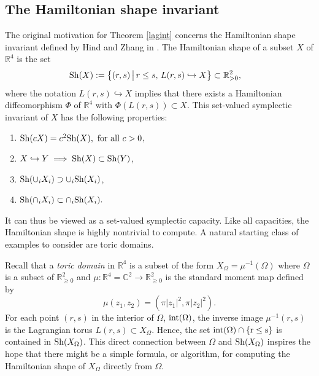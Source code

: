 \documentclass[12pt]{amsart}
\theoremstyle{definition}
\newcommand{\CC}{{\mathbb C}}
\newcommand{\RR}{{\mathbb R}}
\begin{document}
\subsection{The Hamiltonian shape invariant}
The original motivation for Theorem \ref{lagint} concerns the Hamiltonian shape invariant  defined  by Hind and Zhang in \cite{hizh}. The Hamiltonian shape of a subset $X$ of $\RR^4$ is the set 
\begin{align*} 
{\rm Sh}(X) & : = \left\{(r, s) \, \big| \, r \le s, \,  L(r, s) \hookrightarrow X \right\} \subset \RR_{>0}^2,
\end{align*}
where the notation $L(r, s) \hookrightarrow X$ implies that there exists a Hamiltonian diffeomorphism $\Phi$ of $\RR^4$ with $\Phi(L(r,s)) \subset X$. This set-valued symplectic invariant of $X$ has the following properties:\\
\begin{enumerate}
    \item ${\rm Sh}(cX) = c^2 {\rm Sh}(X), \text{ for all } c>0$,\\
    \item $X \hookrightarrow Y \implies {\rm Sh}(X)\subset {\rm Sh}(Y)$,\\
    \item ${\rm Sh}(\cup_i X_i) \supset \cup_i {\rm Sh}(X_i)$,\\
    \item ${\rm Sh}(\cap_i X_i) \subset \cap_i {\rm Sh}(X_i).$\\
\end{enumerate}
It can thus be viewed as a set-valued symplectic capacity. Like all capacities, the Hamiltonian shape is highly nontrivial to compute. A natural starting class of examples to consider are toric domains. 

Recall that a 
{\em toric domain} in $\RR^4$ is a subset of the form $X_{\Omega} = \mu^{-1} (\Omega)$ where $\Omega$ is a subset of $\RR^2_{\ge 0}$
and $\mu: \RR^4=\CC^2 \to \RR^2_{\ge 0}$ is the standard moment map defined by $$\mu(z_1, z_2) = (\pi|z_1|^2, \pi |z_2|^2).$$ 
For each point $(r,s)$ in the interior of $\Omega$, $\rm{int}(\Omega)$, the inverse image $\mu^{-1}(r,s)$ is the Lagrangian torus $L(r,s) \subset X_{\Omega}$. Hence, the set $\rm{int}(\Omega) \cap \{ r \leq s\}$ is contained in ${\rm Sh} (X_{\Omega})$. This direct connection between $\Omega$ and ${\rm Sh}(X_\Omega)$ inspires the hope that there might be a simple 
formula, or algorithm, for computing the Hamiltonian shape of $X_{\Omega}$ directly from $\Omega$.
\end{document}
